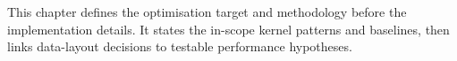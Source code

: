 
This chapter defines the optimisation target and methodology before the
implementation details. It states the in-scope kernel patterns and baselines,
then links data-layout decisions to testable performance hypotheses.







